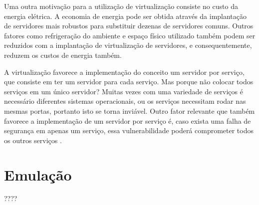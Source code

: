 Uma outra motivação para a utilização de virtualização consiste no custo da energia elétrica. A economia de energia pode ser obtida através 
da implantação de servidores mais robustos para substituir dezenas de servidores comuns. Outros fatores como refrigeração do ambiente e 
espaço físico utilizado também podem ser reduzidos com a implantação de virtualização de servidores, e consequentemente, reduzem os 
custos de energia também.

A virtualização favorece a implementação do conceito um servidor por serviço, que consiste em ter um servidor para cada serviço.
Mas porque não colocar todos serviços em um único servidor? Muitas vezes com uma variedade de serviços é necessário diferentes 
sistemas operacionais, ou os serviços necessitam rodar nas mesmas portas, portanto isto se torna inviável. Outro fator relevante que 
também favorece a implementação de um servidor por serviço é, caso exista uma falha de segurança em apenas um serviço, essa 
vulnerabilidade poderá comprometer todos os outros serviços \cite{carissimi2008}.




\section{Emulação}
????




